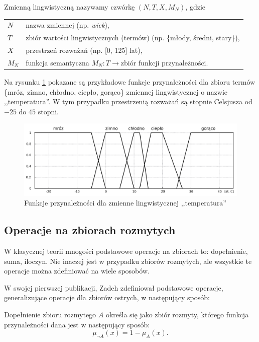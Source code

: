 \begin{definition} Zmienną lingwistyczną nazywamy czwórkę $(N,T,X,M_N)$, gdzie

\begin{tabular}{ll}
  $N$ & \qquad nazwa zmiennej (np. \textit{wiek}), \\
  $T$ & \qquad zbiór wartości lingwistycznych (termów) (np. \{młody, średni,
  stary\}), \\
  $X$ & \qquad przestrzeń rozważań (np. [0, 125] lat), \\
  $M_N$ & \qquad funkcja semantyczna $M_N : T \rightarrow \textrm{zbiór funkcji
  przynależności}$.
\end{tabular}
\end{definition}

Na rysunku \ref{fig:zmienna_lingwistyczna} pokazane są przykładowe funkcje
przynależności dla zbioru termów \{mróz, zimno, chłodno, ciepło, gorąco\}
zmiennej lingwistycznej o nazwie ,,temperatura''. W tym przypadku przestrzenią
rozważań są stopnie Celsjusza od $-25$ do $45$ stopni.

\begin{figure}[ht]
  \includegraphics[width=\linewidth]
  	{chapters/fuzzylogic/zmienna_lingwistyczna}
  \caption{Funkcje przynależności dla zmienne lingwistycznej ,,temperatura''}
  \label{fig:zmienna_lingwistyczna}
\end{figure}

\subsection{Operacje na zbiorach rozmytych}
W klasycznej teorii mnogości podstawowe operacje na zbiorach to: dopełnienie,
suma, iloczyn. Nie inaczej jest w przypadku zbiorów rozmytych, ale wszystkie te
operacje można zdefiniować na wiele sposobów.

W swojej pierwszej publikacji, Zadeh zdefiniował podstawowe operacje,
generalizujące operacje dla zbiorów ostrych, w następujący sposób:

\begin{definition}
Dopełnienie zbioru rozmytego $A$ określa się jako zbiór rozmyty, którego funkcja
przynależności dana jest w następujący sposób:
\begin{equation}
\mu_{\neg A}(x) = 1 - \mu_A(x).
\end{equation}
\end{definition}

